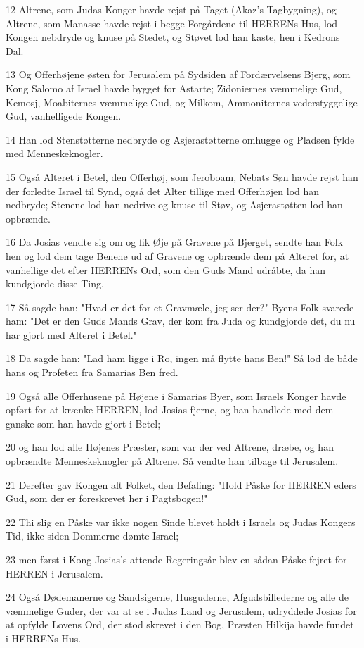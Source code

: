\par 12 Altrene, som Judas Konger havde rejst på Taget (Akaz's Tagbygning), og Altrene, som Manasse havde rejst i begge Forgårdene til HERRENs Hus, lod Kongen nebdryde og knuse på Stedet, og Støvet lod han kaste, hen i Kedrons Dal.
\par 13 Og Offerhøjene østen for Jerusalem på Sydsiden af Fordærvelsens Bjerg, som Kong Salomo af Israel havde bygget for Astarte; Zidoniernes væmmelige Gud, Kemosj, Moabiternes væmmelige Gud, og Milkom, Ammoniternes vederstyggelige Gud, vanhelligede Kongen.
\par 14 Han lod Stenstøtterne nedbryde og Asjerastøtterne omhugge og Pladsen fylde med Menneskeknogler.
\par 15 Også Alteret i Betel, den Offerhøj, som Jeroboam, Nebats Søn havde rejst han der forledte Israel til Synd, også det Alter tillige med Offerhøjen lod han nedbryde; Stenene lod han nedrive og knuse til Støv, og Asjerastøtten lod han opbrænde.
\par 16 Da Josias vendte sig om og fik Øje på Gravene på Bjerget, sendte han Folk hen og lod dem tage Benene ud af Gravene og opbrænde dem på Alteret for, at vanhellige det efter HERRENs Ord, som den Guds Mand udråbte, da han kundgjorde disse Ting,
\par 17 Så sagde han: "Hvad er det for et Gravmæle, jeg ser der?" Byens Folk svarede ham: "Det er den Guds Mands Grav, der kom fra Juda og kundgjorde det, du nu har gjort med Alteret i Betel."
\par 18 Da sagde han: "Lad ham ligge i Ro, ingen må flytte hans Ben!" Så lod de både hans og Profeten fra Samarias Ben fred.
\par 19 Også alle Offerhusene på Højene i Samarias Byer, som Israels Konger havde opført for at krænke HERREN, lod Josias fjerne, og han handlede med dem ganske som han havde gjort i Betel;
\par 20 og han lod alle Højenes Præster, som var der ved Altrene, dræbe, og han opbrændte Menneskeknogler på Altrene. Så vendte han tilbage til Jerusalem.
\par 21 Derefter gav Kongen alt Folket, den Befaling: "Hold Påske for HERREN eders Gud, som der er foreskrevet her i Pagtsbogen!"
\par 22 Thi slig en Påske var ikke nogen Sinde blevet holdt i Israels og Judas Kongers Tid, ikke siden Dommerne dømte Israel;
\par 23 men først i Kong Josias's attende Regeringsår blev en sådan Påske fejret for HERREN i Jerusalem.
\par 24 Også Dødemanerne og Sandsigerne, Husguderne, Afgudsbillederne og alle de væmmelige Guder, der var at se i Judas Land og Jerusalem, udryddede Josias for at opfylde Lovens Ord, der stod skrevet i den Bog, Præsten Hilkija havde fundet i HERRENs Hus.
